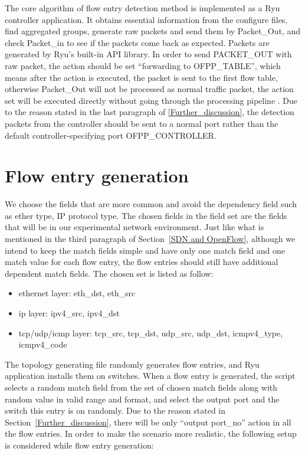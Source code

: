 The core algorithm of flow entry detection method is implemented as a Ryu controller application. It obtains essential information from the configure files, find aggregated groups, generate raw packets and send them by Packet\_Out, and check Packet\_in to see if the packets come back as expected. Packets are generated by Ryu's built-in API library. In order to send PACKET\_OUT with raw packet, the action should be set ``forwarding to OFPP\_TABLE'', which means after the action is executed, the packet is sent to the first flow table, otherwise Packet\_Out will not be processed as normal traffic packet, the action set will be executed directly without going through the processing pipeline \cite{PACKETOUT}. Due to the reason stated in the last paragraph of \ref{Further_discussion}, the detection packets from the controller should be sent to a normal port rather than the default controller-specifying port OFPP\_CONTROLLER. 

\section{Flow entry generation}
We choose the fields that are more common and avoid the dependency field such as ether type, IP protocol type. The chosen fields in the field set are the fields that will be in our experimental network environment. Just like what is mentioned in the third paragraph of Section~\ref{SDN and OpenFlow}, although we intend to keep the match fields simple and have only one match field and one match value for each flow entry, the flow entries should still have additional dependent match fields. The chosen set is listed as follow:

\begin{itemize}
\item
ethernet layer: eth\_dst, eth\_src
\item
ip layer: ipv4\_src, ipv4\_dst
\item
tcp/udp/icmp layer: tcp\_src, tcp\_dst, udp\_src, udp\_dst, icmpv4\_type, icmpv4\_code
\end{itemize}

The topology generating file randomly generates flow entries, and Ryu application installs them on switches. When a flow entry is generated, the script selects a random match field from the set of chosen match fields along with random value in valid range and format, and select the output port and the switch this entry is on randomly. Due to the reason stated in Section~\ref{Further_discussion}, there will be only ``output port\_no'' action in all the flow entries. In order to make the scenario more realistic, the following setup is considered while flow entry generation:

